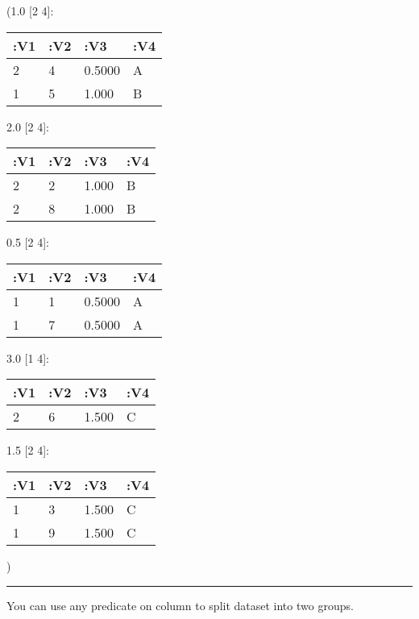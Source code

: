 \documentclass[]{article}
\newenvironment{Shaded}{\begin{snugshade}}{\end{snugshade}}
\newcommand{\KeywordTok}[1]{\textcolor[rgb]{0.13,0.29,0.53}{\textbf{#1}}}
\newcommand{\FloatTok}[1]{\textcolor[rgb]{0.00,0.00,0.81}{#1}}
\newcommand{\VariableTok}[1]{\textcolor[rgb]{0.00,0.00,0.00}{#1}}
\newcommand{\AttributeTok}[1]{\textcolor[rgb]{0.77,0.63,0.00}{#1}}
\newcommand{\NormalTok}[1]{#1}
\begin{document}
(1.0 {[}2 4{]}:

\begin{longtable}[]{@{}llll@{}}
\toprule
:V1 & :V2 & :V3 & :V4\tabularnewline
\midrule
\endhead
2 & 4 & 0.5000 & A\tabularnewline
1 & 5 & 1.000 & B\tabularnewline
\bottomrule
\end{longtable}

2.0 {[}2 4{]}:

\begin{longtable}[]{@{}llll@{}}
\toprule
:V1 & :V2 & :V3 & :V4\tabularnewline
\midrule
\endhead
2 & 2 & 1.000 & B\tabularnewline
2 & 8 & 1.000 & B\tabularnewline
\bottomrule
\end{longtable}

0.5 {[}2 4{]}:

\begin{longtable}[]{@{}llll@{}}
\toprule
:V1 & :V2 & :V3 & :V4\tabularnewline
\midrule
\endhead
1 & 1 & 0.5000 & A\tabularnewline
1 & 7 & 0.5000 & A\tabularnewline
\bottomrule
\end{longtable}

3.0 {[}1 4{]}:

\begin{longtable}[]{@{}llll@{}}
\toprule
:V1 & :V2 & :V3 & :V4\tabularnewline
\midrule
\endhead
2 & 6 & 1.500 & C\tabularnewline
\bottomrule
\end{longtable}

1.5 {[}2 4{]}:

\begin{longtable}[]{@{}llll@{}}
\toprule
:V1 & :V2 & :V3 & :V4\tabularnewline
\midrule
\endhead
1 & 3 & 1.500 & C\tabularnewline
1 & 9 & 1.500 & C\tabularnewline
\bottomrule
\end{longtable}

)

\begin{center}\rule{0.5\linewidth}{0.5pt}\end{center}

You can use any predicate on column to split dataset into two groups.

\begin{Shaded}
\end{Shaded}
\end{document}
